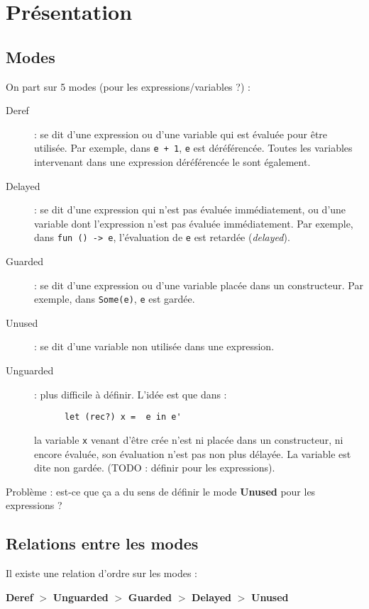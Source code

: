 \documentclass{article}
\title{}
\author{Alban Reynaud}
\date{}
\begin{document}
\maketitle

\section*{Présentation}

\subsection*{Modes}
On part sur 5 modes (pour les expressions/variables ?) :
\begin{description}
  \item[Deref] : se dit d'une expression ou d'une variable qui est évaluée pour être utilisée. Par exemple, dans \verb~e + 1~, \verb&e& est déréférencée. Toutes les variables intervenant dans une expression déréférencée le sont également.
  \item[Delayed] : se dit d'une expression qui n'est pas évaluée immédiatement, ou d'une variable dont l'expression n'est pas évaluée immédiatement. Par exemple, dans \verb~fun () -> e~, l'évaluation de \verb&e& est retardée (\textit{delayed}).
  \item[Guarded] : se dit d'une expression ou d'une variable placée dans un constructeur. Par exemple, dans \verb&Some(e)&, \verb&e& est gardée.
  \item[Unused] : se dit d'une variable non utilisée dans une expression.
  \item[Unguarded] : plus difficile à définir. L'idée est que dans :
    \begin{verbatim}
      let (rec?) x =  e in e'
    \end{verbatim}
    la variable \verb~x~ venant d'être crée n'est ni placée dans un constructeur, ni encore évaluée, son évaluation n'est pas non plus délayée. La variable est dite non gardée. (TODO : définir pour les expressions).
\end{description}

Problème : est-ce que ça a du sens de définir le mode \textbf{Unused} pour les expressions ?

\subsection*{Relations entre les modes}
Il existe une relation d'ordre sur les modes :

\textbf{Deref} $>$ \textbf{Unguarded} $>$ \textbf{Guarded} $>$ \textbf{Delayed} $>$ \textbf{Unused}
\end{document}
